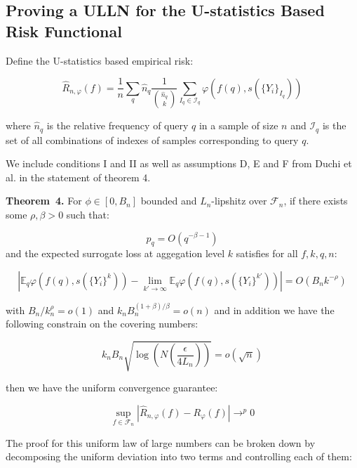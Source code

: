 \documentclass[a4paper,10pt]{article}
\newenvironment{theorem}[1][]{\par\medskip
   \noindent \textbf{Theorem~#1.} \rmfamily}{\medskip}
\begin{document}
\subsection{Proving a ULLN for the U-statistics Based Risk Functional}

Define the U-statistics based empirical risk:

\begin{equation}
  \hat{R}_{n, \varphi}(f) = \frac{1}{n} \sum_q \hat{n}_q \frac{1}{\binom{\hat{n}_q}{k}} \sum_{I_q \in \mathcal{I}_q}\varphi(f(q), s(\{Y_i\}_{I_q}))
\end{equation}

where \(\hat{n}_q\) is the relative frequency of query \(q\) in a sample of size \(n\) and \(\mathcal{I}_q\) is the set of all combinations of indexes of samples corresponding to query \(q\).

We include conditions I and II as well as assumptions D, E and F from Duchi et al. \cite{duchi-2013-ranking} in the statement of theorem 4.
\begin{theorem}[4]
  For \(\phi \in [0, B_n]\) bounded and \(L_n\)-lipshitz over \(\mathcal{F}_n\),
  if there exists some \(\rho, \beta > 0\) such that:

  \begin{equation}
    p_q = O(q^{-\beta -1})
  \end{equation}
  and the expected surrogate loss at aggegation level \(k\) satisfies for all \(f, k, q, n\):

  \begin{equation}
    \left|\mathbb{E}_q\varphi(f(q), s(\{Y_i\}^k)) - \lim_{k' \rightarrow \infty}\mathbb{E}_q\varphi(f(q), s(\{Y_i\}^{k'}))\right| = O(B_nk^{-\rho})
  \end{equation}

  with \(B_n/k_n^\rho = o(1)\) and \(k_nB_n^{(1+\beta)/\beta}=o(n)\) and in addition we have the following constrain on the covering numbers:

  \begin{equation}
    k_nB_n\sqrt{\log\left( N(\frac{\epsilon}{4L_n}) \right)} = o(\sqrt n)
  \end{equation}

  then we have the uniform convergence guarantee:

  \begin{equation}
    \sup_{f \in \mathcal{F}_n}\left| \hat{R}_{n, \varphi}(f) - R_\varphi(f) \right| \rightarrow^p 0
  \end{equation}


\end{theorem}
The proof for this uniform law of large numbers can be broken down by decomposing the uniform deviation into two terms and controlling each of them:
\end{document}
